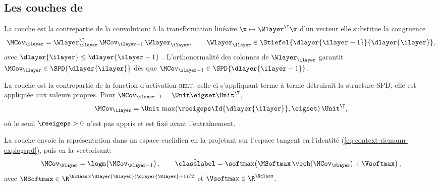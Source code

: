 \subsection{Les couches de \SPDnet}
\label{sec:spdnet-couches}

\begin{definition}
\label{def:spdnet-bimap}
  La couche \BiMap{} est la contrepartie de la convolution: à la transformation
  linéaire $\x\mapsto\Wlayer^\T\x$ d'un vecteur elle substitue la congruence
  \begin{equation}
    \MCov_\ilayer
    =
    \Wlayer_\ilayer^\T\,\MCov_{\ilayer-1}\,\Wlayer_\ilayer,
    \qquad
    \Wlayer_\ilayer\in\Stiefel{\dlayer{\ilayer-1}}{\dlayer{\ilayer}},
    \label{eq:spdnet-bimap}
  \end{equation}
  avec $\dlayer{\ilayer}\leq\dlayer{\ilayer-1}$ .
  L'orthonormalité des colonnes de $\Wlayer_\ilayer$ garantit
  $\MCov_\ilayer\in\SPD{\dlayer{\ilayer}}$ dès que $\MCov_{\ilayer-1}\in\SPD{\dlayer{\ilayer-1}}$.
\end{definition}

\begin{definition}
\label{def:spdnet-reeig}
  La couche \ReEig{} est la contrepartie de la fonction d'activation \textsc{relu}:
  celle-ci s'appliquant terme à terme détruirait la structure SPD, elle est
  appliquée aux valeurs propres. Pour $\MCov_{\ilayer-1}=\Unit\eigset\Unit^\T$,
  \begin{equation}
    \MCov_\ilayer
    =
    \Unit\,\max\!\left(\reeigeps\Id{\dlayer{\ilayer}},\eigset\right)\Unit^\T,
    \label{eq:spdnet-reeig}
  \end{equation}
  où le seuil $\reeigeps>0$ n'est pas appris et est fixé avant l'entraînement.
\end{definition}

\begin{definition}
\label{def:spdnet-logeig}
  La couche \LogEig{} envoie la représentation dans un espace euclidien en la
  projetant sur l'espace tangent en l'identité
  (\cref{eq:context-riemann-explogspd}), puis en la vectorisant:
  \begin{equation}
    \MCov_{\Nlayer}
    =
    \logm\!\left(\MCov_{\Nlayer-1}\right),
    \qquad
    \hat{\classlabel}
    =
    \softmax\!\left(\MSoftmax\,\vech(\MCov_{\Nlayer})+\Vsoftmax\right),
    \label{eq:spdnet-logeig}
  \end{equation}
  avec $\MSoftmax\in\R^{\Nclass\times\dlayer{\Nlayer}(\dlayer{\Nlayer}+1)/2}$ et
  $\Vsoftmax\in\R^{\Nclass}$.
\end{definition}

